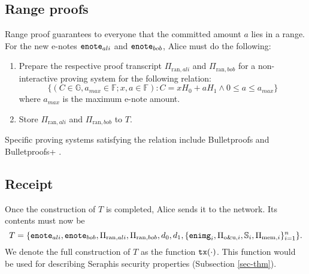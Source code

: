 \documentclass{article}
\theoremstyle{plain}
\theoremstyle{remark}
\begin{document}
\subsection{Range proofs}\label{range}
Range proof guarantees to everyone that the committed amount $a$ lies in a range.  For the new e-notes ${\tt enote}_{ali}$ and ${\tt enote}_{bob}$, Alice must do the following:
\begin{enumerate}
    \item Prepare the respective proof transcript $\Pi_{\text{ran}, ali}$ and $\Pi_{\text{ran}, bob}$ for a non-interactive proving system for the following relation:
$$\{(C \in\mathbb{G}, a_{max}\in\mathbb{F}; x, a\in\mathbb{F}): C = x H_0 + a H_1 \wedge 0\le a \le a_{max}\}$$
	where $a_{max}$ is the maximum e-note amount.
    \item Store $\Pi_{\text{ran}, ali}$ and $\Pi_{\text{ran}, bob}$ to $T$.
\end{enumerate}

Specific proving systems satisfying the relation include Bulletproofs \cite{bp} and Bulletproofs+ \cite{bp-plus}.

\subsection{Receipt}
Once the construction of $T$ is completed, Alice sends it to the network. Its contents must now be
$$T=\{{\tt enote}_{ali}, {\tt enote}_{bob}, \Pi_{\text{ran}, ali}, \Pi_{\text{ran}, bob}, d_0, d_1, \{{\tt enimg}_i, \Pi_{\text{o\&u}, i}, \mathbb{S}_i, \Pi_{\text{mem}, i}\}_{i=1}^n\}.$$
We denote the full construction of $T$ as the function ${\tt tx}(\cdot)$. This function would be used for describing Seraphis security properties (Subsection \ref{sec-thm}).
\end{document}
